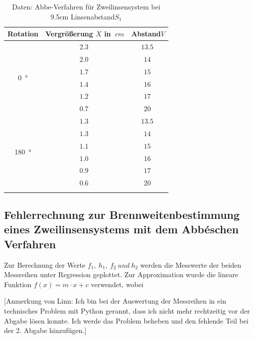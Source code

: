 \begin{table}[h!]
    \begin{center}
        \caption{Daten: Abbe-Verfahren für Zweilinsensystem bei 9.5cm Linsenabstand$S_1$}
        \begin{tabular}{ccc}
            \hline
            Rotation   &  Vergrößerung  $X$ in $\SI{}{cm}$    & Abstand$V$ \\
            \hline
            \multirow{6}{*}{\SI{0}{\degree}}    & $\SI{2.3}{}$ & $\SI{13.5}{}$ \\
                                                & $\SI{2.0}{}$ & $\SI{14}{}$ \\
                                                & $\SI{1.7}{}$ & $\SI{15}{}$ \\
                                                & $\SI{1.4}{}$ & $\SI{16}{}$ \\
                                                & $\SI{1.2}{}$ & $\SI{17}{}$ \\
                                                & $\SI{0.7}{}$ & $\SI{20}{}$ \\
            \hline
            \multirow{6}{*}{\SI{180}{\degree}}  & $\SI{1.3}{}$ & $\SI{13.5}{}$ \\
                                                & $\SI{1.3}{}$ & $\SI{14}{}$ \\
                                                & $\SI{1.1}{}$ & $\SI{15}{}$ \\
                                                & $\SI{1.0}{}$ & $\SI{16}{}$ \\
                                                & $\SI{0.9}{}$ & $\SI{17}{}$ \\
                                                & $\SI{0.6}{}$ & $\SI{20}{}$ \\
            \hline
            \label{tab:Abbe2}
        \end{tabular}
    \end{center}
\end{table}

\clearpage

\subsection{Fehlerrechnung zur Brennweitenbestimmung eines Zweilinsensystems mit dem Abbéschen Verfahren}

Zur Berechnung der Werte $f_1,\ h_1,\ f_2\ und\ h_2$ werden die Messwerte der beiden Messreihen unter Regression geplottet.
Zur Approximation wurde die lineare Funktion $f(x) = m \cdot x + c$ verwendet, wobei 

[Anmerkung von Linn:
Ich bin bei der Auswertung der Messreihen in ein technisches Problem mit Python gerannt, dass ich nicht mehr rechtzeitig vor der Abgabe lösen konnte.
Ich werde das Problem beheben und den fehlende Teil bei der 2. Abgabe hinzufügen.]